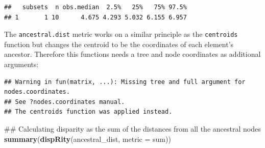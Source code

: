 \documentclass[]{book}
\newenvironment{Shaded}{\begin{snugshade}}{\end{snugshade}}
\newcommand{\KeywordTok}[1]{\textcolor[rgb]{0.13,0.29,0.53}{\textbf{#1}}}
\newcommand{\DataTypeTok}[1]{\textcolor[rgb]{0.13,0.29,0.53}{#1}}
\newcommand{\DecValTok}[1]{\textcolor[rgb]{0.00,0.00,0.81}{#1}}
\newcommand{\StringTok}[1]{\textcolor[rgb]{0.31,0.60,0.02}{#1}}
\newcommand{\OtherTok}[1]{\textcolor[rgb]{0.56,0.35,0.01}{#1}}
\newcommand{\OperatorTok}[1]{\textcolor[rgb]{0.81,0.36,0.00}{\textbf{#1}}}
\newcommand{\NormalTok}[1]{#1}
\theoremstyle{definition}
\theoremstyle{definition}
\theoremstyle{definition}
\theoremstyle{remark}
\begin{document}
\begin{verbatim}
##   subsets  n obs.median  2.5%   25%   75% 97.5%
## 1       1 10      4.675 4.293 5.032 6.155 6.957
\end{verbatim}

The \texttt{ancestral.dist} metric works on a similar principle as the
\texttt{centroids} function but changes the centroid to be the
coordinates of each element's ancestor. Therefore this functions needs a
tree and node coordinates as additional arguments:

\begin{Shaded}
\end{Shaded}

\begin{verbatim}
## Warning in fun(matrix, ...): Missing tree and full argument for nodes.coordinates.
## See ?nodes.coordinates manual.
## The centroids function was applied instead.
\end{verbatim}

\begin{Shaded}
\begin{Highlighting}[]
\NormalTok{## Calculating disparity as the sum of the distances from all the ancestral nodes}
\KeywordTok{summary}\NormalTok{(}\KeywordTok{dispRity}\NormalTok{(ancestral_dist, }\DataTypeTok{metric =}\NormalTok{ sum))}
\end{Highlighting}
\end{Shaded}
\end{document}

